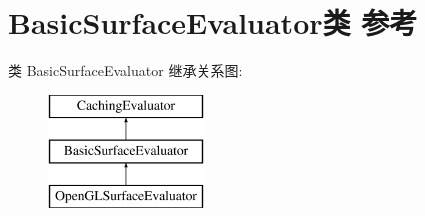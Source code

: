 \hypertarget{class_basic_surface_evaluator}{}\section{Basic\+Surface\+Evaluator类 参考}
\label{class_basic_surface_evaluator}
类 Basic\+Surface\+Evaluator 继承关系图\+:\begin{figure}[H]
\begin{center}
\leavevmode
\includegraphics[height=3.000000cm]{class_basic_surface_evaluator}
\end{center}
\end{figure}

